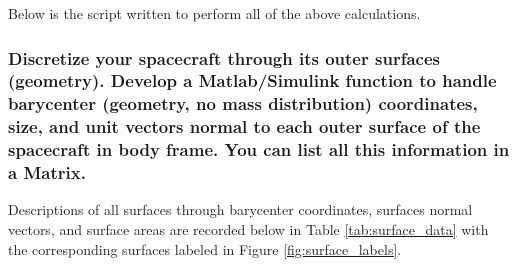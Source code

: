 Below is the script written to perform all of the above calculations.



\subsubsection{Discretize your spacecraft through its outer surfaces (geometry). Develop a Matlab/Simulink function to handle barycenter (geometry, no mass distribution) coordinates, size, and unit vectors normal to each outer surface of the spacecraft in body frame. You can list all this information in a Matrix. }

Descriptions of all surfaces through barycenter coordinates, surfaces normal vectors, and surface areas are recorded below in Table \ref{tab:surface_data} with the corresponding surfaces labeled in Figure \ref{fig:surface_labels}. 

